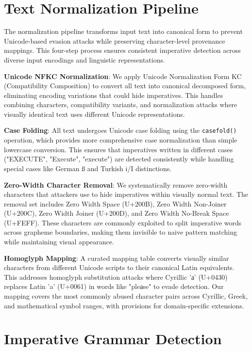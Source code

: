 \section{Text Normalization Pipeline}

The normalization pipeline transforms input text into canonical form to prevent Unicode-based evasion attacks while preserving character-level provenance mappings. This four-step process ensures consistent imperative detection across diverse input encodings and linguistic representations.

\textbf{Unicode NFKC Normalization}: We apply Unicode Normalization Form KC (Compatibility Composition) to convert all text into canonical decomposed form, eliminating encoding variations that could hide imperatives. This handles combining characters, compatibility variants, and normalization attacks where visually identical text uses different Unicode representations.

\textbf{Case Folding}: All text undergoes Unicode case folding using the \texttt{casefold()} operation, which provides more comprehensive case normalization than simple lowercase conversion. This ensures that imperatives written in different cases ("EXECUTE", "Execute", "execute") are detected consistently while handling special cases like German ß and Turkish i/I distinctions.

\textbf{Zero-Width Character Removal}: We systematically remove zero-width characters that attackers use to hide imperatives within visually normal text. The removal set includes Zero Width Space (U+200B), Zero Width Non-Joiner (U+200C), Zero Width Joiner (U+200D), and Zero Width No-Break Space (U+FEFF). These characters are commonly exploited to split imperative words across grapheme boundaries, making them invisible to naive pattern matching while maintaining visual appearance.

\textbf{Homoglyph Mapping}: A curated mapping table converts visually similar characters from different Unicode scripts to their canonical Latin equivalents. This addresses homoglyph substitution attacks where Cyrillic 'а' (U+0430) replaces Latin 'a' (U+0061) in words like "pleаse" to evade detection. Our mapping covers the most commonly abused character pairs across Cyrillic, Greek, and mathematical symbol ranges, with provisions for domain-specific extensions.

\section{Imperative Grammar Detection}

